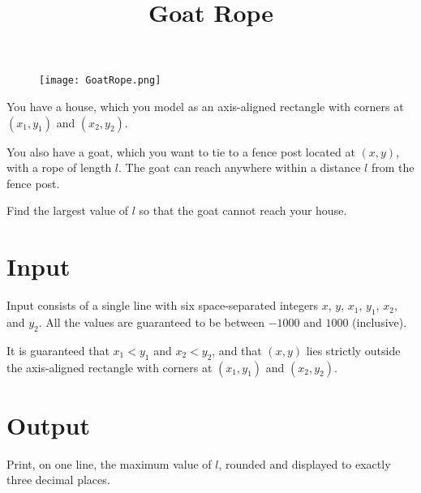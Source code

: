 \documentclass{article}
\title{Goat Rope}
\date{}
\begin{document}
\maketitle
\begin{figure}[h!]
\centering
\texttt{[image: GoatRope.png]}
\end{figure}

You have a house, which you model as an axis-aligned rectangle
with corners at $(x_1, y_1)$ and $(x_2, y_2)$.

You also have a goat, which you want to tie to a fence post
located at $(x, y)$, with a rope of length $l$. The goat can reach
anywhere within a distance $l$ from the fence post.

Find the largest value of $l$ so that the goat cannot reach your house.

\section{Input}

Input consists of a single line with six space-separated integers
$x$, $y$, $x_1$, $y_1$, $x_2$, and $y_2$. All the values are guaranteed
to be between $-1000$ and $1000$ (inclusive).

It is guaranteed that $x_1 < y_1$ and $x_2 < y_2$, and that $(x, y)$
lies strictly outside the axis-aligned rectangle with corners at
$(x_1, y_1)$ and $(x_2, y_2)$.

\section{Output}

Print, on one line, the maximum value of $l$, rounded and displayed to
exactly three decimal places.

\end{document}
